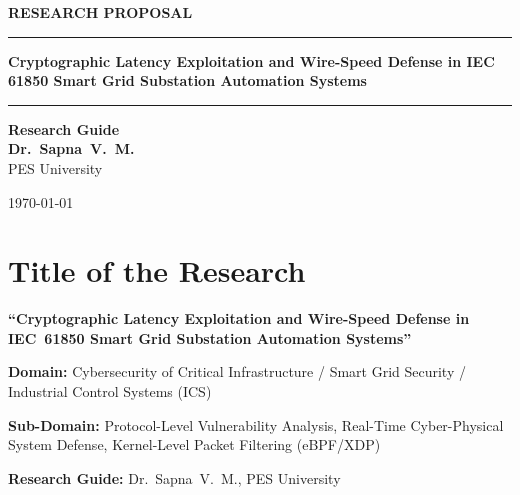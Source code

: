 \documentclass[12pt,a4paper]{article}
\begin{document}
\begin{titlepage}
\centering
\vspace*{1.5cm}

{\Large\textbf{RESEARCH PROPOSAL}}

\vspace{0.8cm}

\rule{\textwidth}{1pt}
\vspace{0.4cm}

{\LARGE\bfseries Cryptographic Latency Exploitation and Wire-Speed Defense in IEC 61850 Smart Grid Substation Automation Systems}

\vspace{0.4cm}
\rule{\textwidth}{1pt}

\vspace{2cm}

{\large
\textbf{Research Guide}\\[0.2cm]
{\Large\textbf{Dr.~Sapna~V.~M.}}\\[0.15cm]
PES University
}

\vfill

{\large \today}

\end{titlepage}

\newpage
\tableofcontents
\newpage

\section{Title of the Research}

\textbf{``Cryptographic Latency Exploitation and Wire-Speed Defense in IEC~61850 Smart Grid Substation Automation Systems''}

\vspace{0.5cm}

\noindent\textbf{Domain:} Cybersecurity of Critical Infrastructure / Smart Grid Security / Industrial Control Systems (ICS)

\noindent\textbf{Sub-Domain:} Protocol-Level Vulnerability Analysis, Real-Time Cyber-Physical System Defense, Kernel-Level Packet Filtering (eBPF/XDP)

\noindent\textbf{Research Guide:} Dr.~Sapna~V.~M., PES University
\end{document}

